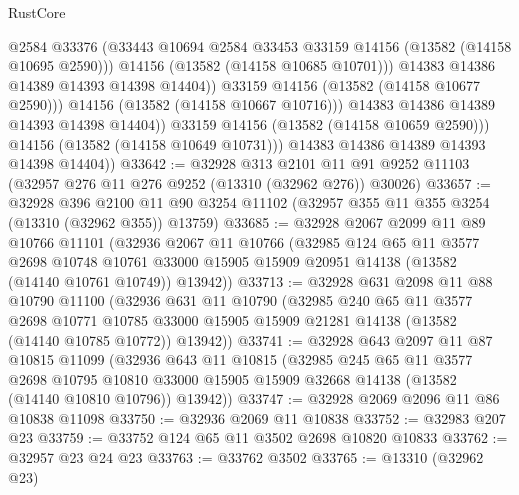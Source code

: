 \begin{lexlean}{RustCore}
\begin{coremodule}
                          @2584
                          @33376
                          (@33443 @10694 @2584 @33453 @33159 @14156 (@13582 (@14158 @10695 @2590)))
                          @14156
                          (@13582 (@14158 @10685 @10701)))
                        @14383
                        @14386
                        @14389
                        @14393
                        @14398
                        @14404))
                    @33159
                    @14156
                    (@13582 (@14158 @10677 @2590)))
                  @14156
                  (@13582 (@14158 @10667 @10716)))
                @14383
                @14386
                @14389
                @14393
                @14398
                @14404))
            @33159
            @14156
            (@13582 (@14158 @10659 @2590)))
          @14156
          (@13582 (@14158 @10649 @10731)))
        @14383
        @14386
        @14389
        @14393
        @14398
        @14404))
@33642 := @32928
    @313
    @2101
    @11
    @91
    @9252
    @11103
    (@32957 @276 @11 @276 @9252 (@13310 (@32962 @276)) @30026)
@33657 := @32928
    @396
    @2100
    @11
    @90
    @3254
    @11102
    (@32957 @355 @11 @355 @3254 (@13310 (@32962 @355)) @13759)
@33685 := @32928
    @2067
    @2099
    @11
    @89
    @10766
    @11101
    (@32936
      @2067
      @11
      @10766
      (@32985
        @124
        @65
        @11
        @3577
        @2698
        @10748
        @10761
        @33000
        @15905
        @15909
        @20951
        @14138
        (@13582 (@14140 @10761 @10749))
        @13942))
@33713 := @32928
    @631
    @2098
    @11
    @88
    @10790
    @11100
    (@32936
      @631
      @11
      @10790
      (@32985
        @240
        @65
        @11
        @3577
        @2698
        @10771
        @10785
        @33000
        @15905
        @15909
        @21281
        @14138
        (@13582 (@14140 @10785 @10772))
        @13942))
@33741 := @32928
    @643
    @2097
    @11
    @87
    @10815
    @11099
    (@32936
      @643
      @11
      @10815
      (@32985
        @245
        @65
        @11
        @3577
        @2698
        @10795
        @10810
        @33000
        @15905
        @15909
        @32668
        @14138
        (@13582 (@14140 @10810 @10796))
        @13942))
@33747 := @32928 @2069 @2096 @11 @86 @10838 @11098
@33750 := @32936 @2069 @11 @10838
@33752 := @32983 @207 @23
@33759 := @33752 @124 @65 @11 @3502 @2698 @10820 @10833
@33762 := @32957 @23 @24 @23
@33763 := @33762 @3502
@33765 := @13310 (@32962 @23)

\end{coremodule}
\end{lexlean}
